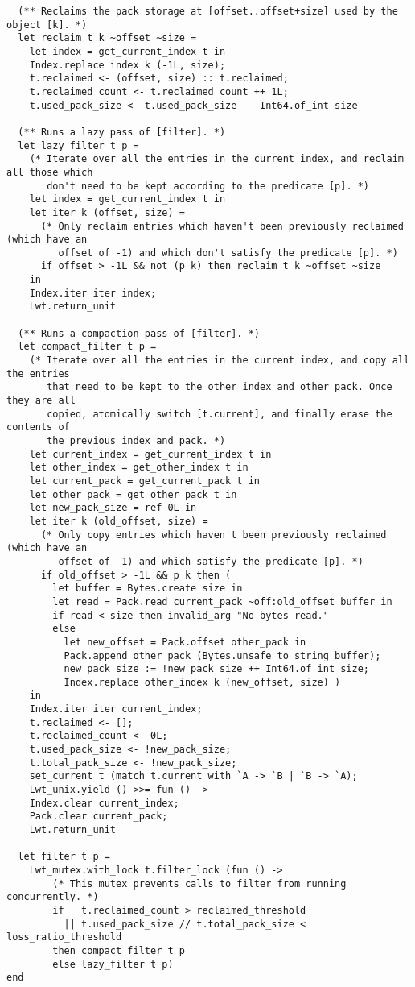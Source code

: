 \begin{verbatim}
  (** Reclaims the pack storage at [offset..offset+size] used by the object [k]. *)
  let reclaim t k ~offset ~size =
    let index = get_current_index t in
    Index.replace index k (-1L, size);
    t.reclaimed <- (offset, size) :: t.reclaimed;
    t.reclaimed_count <- t.reclaimed_count ++ 1L;
    t.used_pack_size <- t.used_pack_size -- Int64.of_int size

  (** Runs a lazy pass of [filter]. *)
  let lazy_filter t p =
    (* Iterate over all the entries in the current index, and reclaim all those which
       don't need to be kept according to the predicate [p]. *)
    let index = get_current_index t in
    let iter k (offset, size) =
      (* Only reclaim entries which haven't been previously reclaimed (which have an
         offset of -1) and which don't satisfy the predicate [p]. *)
      if offset > -1L && not (p k) then reclaim t k ~offset ~size
    in
    Index.iter iter index;
    Lwt.return_unit

  (** Runs a compaction pass of [filter]. *)
  let compact_filter t p =
    (* Iterate over all the entries in the current index, and copy all the entries
       that need to be kept to the other index and other pack. Once they are all
       copied, atomically switch [t.current], and finally erase the contents of
       the previous index and pack. *)
    let current_index = get_current_index t in
    let other_index = get_other_index t in
    let current_pack = get_current_pack t in
    let other_pack = get_other_pack t in
    let new_pack_size = ref 0L in
    let iter k (old_offset, size) =
      (* Only copy entries which haven't been previously reclaimed (which have an
         offset of -1) and which satisfy the predicate [p]. *)
      if old_offset > -1L && p k then (
        let buffer = Bytes.create size in
        let read = Pack.read current_pack ~off:old_offset buffer in
        if read < size then invalid_arg "No bytes read."
        else
          let new_offset = Pack.offset other_pack in
          Pack.append other_pack (Bytes.unsafe_to_string buffer);
          new_pack_size := !new_pack_size ++ Int64.of_int size;
          Index.replace other_index k (new_offset, size) )
    in
    Index.iter iter current_index;
    t.reclaimed <- [];
    t.reclaimed_count <- 0L;
    t.used_pack_size <- !new_pack_size;
    t.total_pack_size <- !new_pack_size;
    set_current t (match t.current with `A -> `B | `B -> `A);
    Lwt_unix.yield () >>= fun () ->
    Index.clear current_index;
    Pack.clear current_pack;
    Lwt.return_unit

  let filter t p =
    Lwt_mutex.with_lock t.filter_lock (fun () ->
        (* This mutex prevents calls to filter from running concurrently. *)
        if   t.reclaimed_count > reclaimed_threshold
          || t.used_pack_size // t.total_pack_size < loss_ratio_threshold
        then compact_filter t p
        else lazy_filter t p)
end
\end{verbatim}